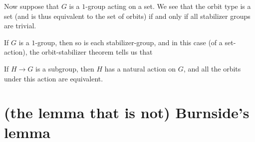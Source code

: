 Now suppose that $G$ is a $1$-group acting on a set.
We see that the orbit type is a set
(and is thus equivalent to the set of orbits)
if and only if
all stabilizer groups are trivial.

If $G$ is a $1$-group,
then so is each stabilizer-group,
and in this case (of a set-action),
the orbit-stabilizer theorem
tells us that 

\begin{theorem}
  If $H \to G$ is a subgroup, then $H$ has a natural action on $G$,
  and all the orbits under this action are equivalent.
\end{theorem}

\section{(the lemma that is not) Burnside's lemma}

